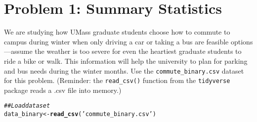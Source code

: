 \documentclass[11pt,letterpaper]{article}\usepackage[]{graphicx}\usepackage[]{xcolor}
\makeatletter
\newcommand{\hlstr}[1]{\textcolor[rgb]{0.192,0.494,0.8}{#1}}%
\newcommand{\hlcom}[1]{\textcolor[rgb]{0.678,0.584,0.686}{\textit{#1}}}%
\newcommand{\hlstd}[1]{\textcolor[rgb]{0.345,0.345,0.345}{#1}}%
\newcommand{\hlkwb}[1]{\textcolor[rgb]{0.69,0.353,0.396}{#1}}%
\newcommand{\hlkwd}[1]{\textcolor[rgb]{0.737,0.353,0.396}{\textbf{#1}}}%
\newenvironment{kframe}{%
 \def\at@end@of@kframe{}%
 \ifinner\ifhmode%
  \def\at@end@of@kframe{\end{minipage}}%
  \begin{minipage}{\columnwidth}%
 \fi\fi%
 \def\FrameCommand##1{\hskip\@totalleftmargin \hskip-\fboxsep
 \colorbox{shadecolor}{##1}\hskip-\fboxsep
     \hskip-\linewidth \hskip-\@totalleftmargin \hskip\columnwidth}%
 \MakeFramed {\advance\hsize-\width
   \@totalleftmargin\z@ \linewidth\hsize
   \@setminipage}}%
 {\par\unskip\endMakeFramed%
 \at@end@of@kframe}
\newenvironment{knitrout}{}{} %
\makeatother
\begin{document}
\section*{Problem 1: Summary Statistics}

We are studying how UMass graduate students choose how to commute to campus during winter when only driving a car or taking a bus are feasible options---assume the weather is too severe for even the heartiest graduate students to ride a bike or walk. This information will help the university to plan for parking and bus needs during the winter months. Use the \texttt{commute\_binary.csv} dataset for this problem. (Reminder: the \texttt{read\_csv()} function from the \texttt{tidyverse} package reads a .csv file into memory.)

\begin{knitrout}
\color{fgcolor}\begin{kframe}
\begin{alltt}
\hlcom{## Load dataset}
\hlstd{data_binary} \hlkwb{<-} \hlkwd{read_csv}\hlstd{(}\hlstr{'commute_binary.csv'}\hlstd{)}
\end{alltt}


{\ttfamily\noindent\itshape{}}\end{kframe}
\end{knitrout}
\end{document}
